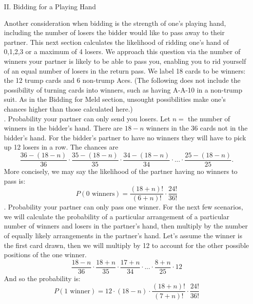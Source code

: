 \documentclass[11pt]{article}
\begin{document}
\begin{center}
 II. Bidding for a Playing Hand
\end{center}
\indent
Another consideration when bidding is the strength of one's playing hand, including the number of losers the bidder would like to pass away to their partner. This next section calculates the likelihood of ridding one's hand of 0,1,2,3 or a maximum of 4 losers. We approach this question via the number of winners your partner is likely to be able to pass you, enabling you to rid yourself of an equal number of losers in the return pass. We label 18 cards to be winners: the 12 trump cards and 6 non-trump Aces. (The following does not include the possibility of turning cards into winners, such as having A-A-10 in a non-trump suit. As in the Bidding for Meld section, unsought  possibilities make one's chances higher than those calculated here.)\\
. Probability your partner can only send you losers. Let $n=$ the number of winners in the bidder's hand. There are $18-n$ winners in the 36 cards not in the bidder's hand. For the bidder's partner to have no winners they will have to pick up 12 losers in a row. The chances are
\begin{equation}
  \frac{36-(18-n)}{36} \cdot \frac{35-(18-n)}{35}\cdot \frac{34-(18-n)}{34}\cdot ...\cdot \frac{25-(18-n)}{25}.
\end{equation}
More concisely, we may say the likelihood of the partner having no winners to pass is:
\begin{equation}
 P(0\text{ winners})= \frac{(18+n)!}{(6+n)!}\cdot \frac{24!}{36!}
\end{equation}
. Probability your partner can only pass one winner. For the next few scenarios, we will calculate the probability of a particular arrangement of a particular number of winners and losers in the partner's hand, then multiply by the number of equally likely arrangements in the partner's hand. Let's assume the winner is the first card drawn, then we will multiply by 12 to account for the other possible positions of the one winner.
\begin{equation}
\frac{18-n}{36}\cdot \frac{18+n}{35}\cdot \frac {17+n}{34}\cdot ...\cdot \frac{8+n}{25} \cdot 12
\end {equation}
And so the probability is:
\begin{equation}
 P(1 \text{ winner})= 12\cdot (18-n)\cdot \frac{(18+n)!}{(7+n)!}\cdot \frac{24!}{36!}
\end{equation}
\indent
\end{document}
